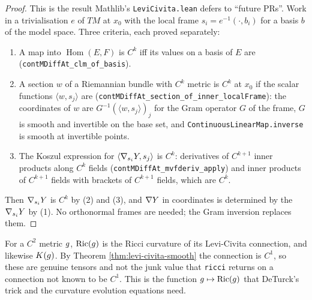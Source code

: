\begin{proof}
  \leanok
  This is the result Mathlib's \texttt{LeviCivita.lean} defers to ``future
  PRs''. Work in a trivialisation $e$ of $TM$ at $x_0$ with the local frame
  $s_i = e^{-1}(\cdot, b_i)$ for a basis $b$ of the model space. Three
  criteria, each proved separately:
  \begin{enumerate}
  \item A map into $\operatorname{Hom}(E, F)$ is $C^k$ iff its values on a
    basis of $E$ are (\texttt{contMDiffAt\_clm\_of\_basis}).
  \item A section $w$ of a Riemannian bundle with $C^k$ metric is $C^k$ at
    $x_0$ if the scalar functions $\langle w, s_j\rangle$ are
    (\texttt{contMDiffAt\_section\_of\_inner\_localFrame}): the coordinates
    of $w$ are $G^{-1}(\langle w, s_j\rangle)_j$ for the Gram operator $G$ of
    the frame, $G$ is smooth and invertible on the base set, and
    \texttt{ContinuousLinearMap.inverse} is smooth at invertible points.
  \item The Koszul expression for $\langle \nabla_{s_i} Y, s_j\rangle$ is
    $C^k$: derivatives of $C^{k+1}$ inner products along $C^{k}$ fields
    (\texttt{contMDiffAt\_mvfderiv\_apply}) and inner products of $C^{k+1}$
    fields with brackets of $C^{k+1}$ fields, which are $C^k$.
  \end{enumerate}
  Then $\nabla_{s_i} Y$ is $C^k$ by (2) and (3), and $\nabla Y$ in coordinates
  is determined by the $\nabla_{s_i} Y$ by (1). No orthonormal frames are needed;
  the Gram inversion replaces them.
\end{proof}

\begin{definition}
  \label{def:ricci-of-metric}
  \leanok
  For a $C^2$ metric $g$, $\operatorname{Ric}(g)$ is the Ricci curvature of its
  Levi-Civita connection, and likewise $K(g)$. By
  Theorem \ref{thm:levi-civita-smooth} the connection is $C^1$, so these are
  genuine tensors and not the junk value that \texttt{ricci} returns on a
  connection not known to be $C^1$. This is the function
  $g \mapsto \operatorname{Ric}(g)$ that DeTurck's trick and the curvature evolution
  equations need.
\end{definition}

